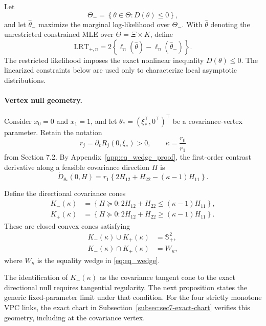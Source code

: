 Let
\begin{equation*}
\Theta_-
=
\left\{
\theta\in\Theta:
D(\theta)\leq 0
\right\},
\end{equation*}
and let $\widehat{\theta}_-$ maximize the marginal
log-likelihood over $\Theta_-$. With $\widehat{\theta}$
denoting the unrestricted constrained MLE over
$\Theta=\Xi\times K$, define
\begin{equation}
\mathrm{LRT}_{+,n}
=
2\left\{
\ell_n(\widehat{\theta})
-
\ell_n(\widehat{\theta}_-)
\right\}.
\label{eq:directional-lrt}
\end{equation}
The restricted likelihood imposes the exact nonlinear
inequality $D(\theta)\leq 0$. The linearized constraints
below are used only to characterize local asymptotic
distributions.

\paragraph{Vertex null geometry.}

Consider $x_0=0$ and $x_1=1$, and let
$\theta_*=(\xi_*^\top,0^\top)^\top$ be a covariance-vertex
parameter. Retain the notation
\begin{equation*}
r_j
=
\partial_v R_j(0,\xi_*)>0,
\qquad
\kappa
=
\frac{r_0}{r_1}
\end{equation*}
from Section 7.2. By Appendix~\ref{app:eq_wedge_proof}, the first-order
contrast derivative along a feasible covariance
direction $H$ is
\begin{equation}
\dot{D}_{\theta_*}(0,H)
=
r_1
\left\{
2H_{12}+H_{22}
-
(\kappa-1)H_{11}
\right\}.
\label{eq:directional-vertex-derivative}
\end{equation}

Define the directional covariance cones
\begin{align}
K_-(\kappa)
&=
\left\{
H\succeq 0:
2H_{12}+H_{22}
\leq
(\kappa-1)H_{11}
\right\},
\label{eq:directional-negative-cone}
\\
K_+(\kappa)
&=
\left\{
H\succeq 0:
2H_{12}+H_{22}
\geq
(\kappa-1)H_{11}
\right\}.
\label{eq:directional-positive-cone}
\end{align}
These are closed convex cones satisfying
\begin{align}
K_-(\kappa)\cup K_+(\kappa)
&=
\mathbb{S}_+^2,
\\
K_-(\kappa)\cap K_+(\kappa)
&=
W_\kappa,
\end{align}
where $W_\kappa$ is the equality wedge in \eqref{eq:eq_wedge}.

The identification of $K_-(\kappa)$ as the covariance
tangent cone to the exact directional null requires
tangential regularity. The next proposition states the generic
fixed-parameter limit under that condition. For the four
strictly monotone VPC links, the exact chart in
Subsection~\ref{subsec:sec7-exact-chart} verifies this geometry,
including at the covariance vertex.

